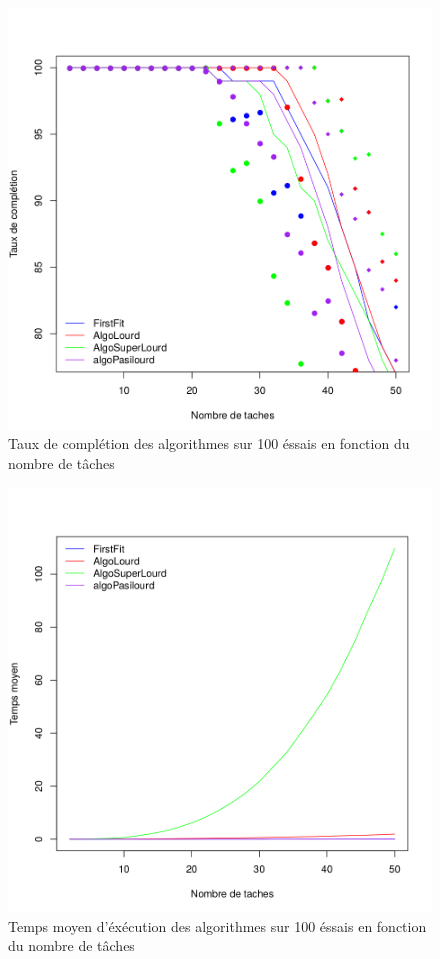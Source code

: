 \documentclass[11pt]{article}
\begin{document}
\begin{figure}[!ht]
    \center
    \includegraphics[scale = 0.4]{taux_completion}
    \caption{Taux de complétion des algorithmes sur 100 éssais en fonction du nombre de tâches}
\end{figure}

\begin{figure}[!ht]
    \center
    \includegraphics[scale = 0.4]{temps_moyen}
    \caption{Temps moyen d'éxécution des algorithmes sur 100 éssais en fonction du nombre de tâches}
\end{figure}
\end{document}
